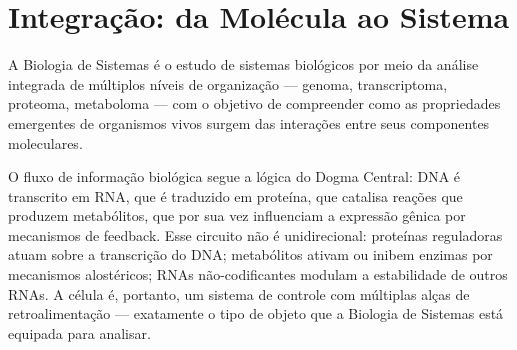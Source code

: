 \section{Integração: da Molécula ao Sistema}

\begin{definicaoenv}
A Biologia de Sistemas é o estudo de sistemas biológicos por meio da análise integrada
de múltiplos níveis de organização --- genoma, transcriptoma, proteoma, metaboloma ---
com o objetivo de compreender como as propriedades emergentes de organismos vivos surgem
das interações entre seus componentes moleculares.
\end{definicaoenv}

O fluxo de informação biológica segue a lógica do Dogma Central: DNA é transcrito em
RNA, que é traduzido em proteína, que catalisa reações que produzem metabólitos, que
por sua vez influenciam a expressão gênica por mecanismos de feedback. Esse circuito
não é unidirecional: proteínas reguladoras atuam sobre a transcrição do DNA; metabólitos
ativam ou inibem enzimas por mecanismos alostéricos; RNAs não-codificantes modulam a
estabilidade de outros RNAs. A célula é, portanto, um sistema de controle com múltiplas
alças de retroalimentação --- exatamente o tipo de objeto que a Biologia de Sistemas
está equipada para analisar.

